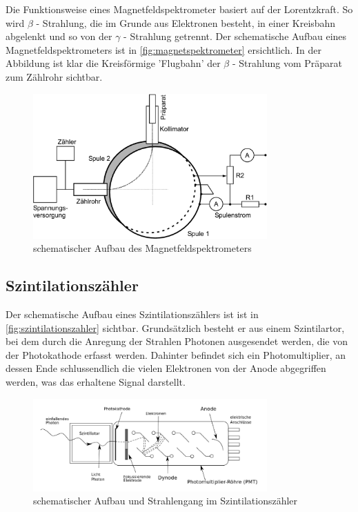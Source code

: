 \documentclass[12pt,english,ngerman]{scrartcl}
\begin{document}
Die Funktionsweise eines Magnetfeldspektrometer basiert auf der Lorentzkraft.
So wird \(\beta\) - Strahlung, die im Grunde aus Elektronen besteht, in einer
Kreisbahn abgelenkt und so von der \(\gamma\) - Strahlung getrennt. Der
schematische Aufbau eines Magnetfeldspektrometers ist in
\autoref{fig:magnetspektrometer} ersichtlich. In der Abbildung ist klar die
Kreisförmige 'Flugbahn' der \(\beta\) - Strahlung vom Präparat zum Zählrohr
sichtbar.\cite[]{}

\begin{figure}[H]
	\begin{center}
		\includegraphics[width = 0.8\textwidth]{./figures/fig5.png}

	\end{center}
	\caption{schematischer Aufbau des Magnetfeldspektrometers~\cite[]{}}
	\label{fig:magnetspektrometer}

\end{figure}

\subsection{Szintilationszähler}

Der schematische Aufbau eines Szintilationszählers ist ist in
\autoref{fig:szintilationszahler} sichtbar. Grundsätzlich besteht er aus einem
Szintilartor, bei dem durch die Anregung der Strahlen Photonen ausgesendet
werden, die von der Photokathode erfasst werden. Dahinter befindet sich ein
Photomultiplier, an dessen Ende schlussendlich die vielen Elektronen von der
Anode abgegriffen werden, was das erhaltene Signal darstellt.\cite[]{}

\begin{figure}[H]
	\begin{center}
		\includegraphics[width = 0.8\textwidth]{./figures/szintilationszahler.png}

	\end{center}
	\caption{schematischer Aufbau und Strahlengang im Szintilationszähler~\cite[]{}}
	\label{fig:szintilationszahler}

\end{figure}
\end{document}
